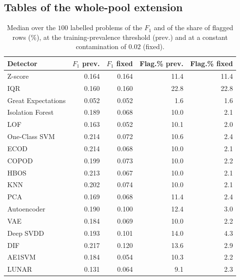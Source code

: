 \documentclass[conference]{IEEEtran}
\begin{document}
\subsection{Tables of the whole-pool extension}
\label{app:pool-tables}
\begin{table}[t]
\caption{Median over the $100$ labelled problems of the $F_1$ and of the share of flagged rows (\%), at the training-prevalence threshold (prev.) and at a constant contamination of $0.02$ (fixed).}
\label{tab:pool-fixed}
\centering
\footnotesize
\setlength{\tabcolsep}{4pt}
\begin{tabular}{lrrrr}
\toprule
Detector & $F_1$ prev. & $F_1$ fixed & Flag.\% prev. & Flag.\% fixed \\
\midrule
Z-score            & 0.164 & 0.164 & 11.4 & 11.4 \\
IQR                & 0.160 & 0.160 & 22.8 & 22.8 \\
Great Expectations & 0.052 & 0.052 & 1.6 & 1.6 \\
\midrule
Isolation Forest   & 0.189 & 0.068 & 10.0 & 2.1 \\
LOF                & 0.163 & 0.052 & 10.1 & 2.0 \\
One-Class SVM      & 0.214 & 0.072 & 10.6 & 2.4 \\
ECOD               & 0.214 & 0.068 & 10.0 & 2.1 \\
COPOD              & 0.199 & 0.073 & 10.0 & 2.2 \\
HBOS               & 0.213 & 0.067 & 10.0 & 2.1 \\
KNN                & 0.202 & 0.074 & 10.0 & 2.1 \\
PCA                & 0.169 & 0.068 & 11.4 & 2.4 \\
\midrule
Autoencoder        & 0.190 & 0.100 & 12.4 & 3.0 \\
VAE                & 0.184 & 0.069 & 10.0 & 2.2 \\
Deep SVDD          & 0.193 & 0.101 & 14.0 & 4.3 \\
DIF                & 0.217 & 0.120 & 13.6 & 2.9 \\
AE1SVM             & 0.184 & 0.054 & 10.3 & 2.2 \\
LUNAR              & 0.131 & 0.064 & 9.1 & 2.3 \\
\bottomrule
\end{tabular}
\end{table}
\end{document}

